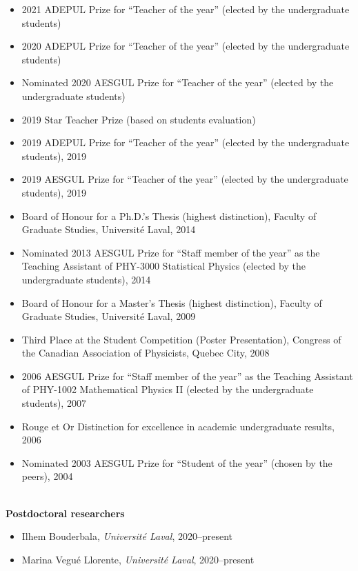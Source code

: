 \documentclass[11pt]{article}
\newlength{\BoxWidth}
\newcommand{\TitreA}[1]{\colorbox{background}{\makebox[\BoxWidth][c]{\Large\textrm{\textsc{#1}}}}\vspace{0.75\baselineskip}\\}
\newcommand{\SousTitreA}[2]{{\normalsize\textbf{#1} #2 \vspace{-0.5\baselineskip}}}
\newcommand{\SousTitreB}[2]{{\vspace{0.4\baselineskip}\SousTitreA{#1}{#2}}}
\newlength{\EspaceListe}
\begin{document}
%
%
%
\SousTitreB{Other Recognitions}{}
%
\begin{itemize}[itemsep=\EspaceListe]
  \item 2021 ADEPUL Prize for ``Teacher of the year'' (elected by the undergraduate students)
  \item 2020 ADEPUL Prize for ``Teacher of the year'' (elected by the undergraduate students)
  \item Nominated 2020 AESGUL Prize for ``Teacher of the year'' (elected by the undergraduate students)
  \item 2019 Star Teacher Prize (based on students evaluation)
  \item 2019 ADEPUL Prize for ``Teacher of the year'' (elected by the undergraduate students), 2019
  \item 2019 AESGUL Prize for ``Teacher of the year'' (elected by the undergraduate students), 2019
  \item Board of Honour for a Ph.D.'s Thesis (highest distinction), Faculty of Graduate Studies, Universit\'e Laval, 2014
  \item Nominated 2013 AESGUL Prize for ``Staff member of the year'' as the Teaching Assistant of PHY-3000 Statistical Physics (elected by the undergraduate students), 2014
  \item Board of Honour for a Master's Thesis (highest distinction), Faculty of Graduate Studies, Universit\'e Laval, 2009
  \item Third Place at the Student Competition (Poster Presentation), Congress of the Canadian Association of Physicists, Quebec City, 2008
  \item 2006 AESGUL Prize for ``Staff member of the year'' as the Teaching Assistant of PHY-1002 Mathematical Physics II (elected by the undergraduate students), 2007
  \item Rouge et Or Distinction for excellence in academic undergraduate results, 2006
  \item Nominated 2003 AESGUL Prize for ``Student of the year'' (chosen by the peers), 2004
\end{itemize}\vspace{0.75\baselineskip}
%
%
%
%
%
\TitreA{Mentoring}
%
\SousTitreA{Postdoctoral researchers}{}
%
\begin{itemize}[itemsep=\EspaceListe]
  \item Ilhem Bouderbala, \textit{Universit\'e Laval}, 2020--present
  \item Marina Vegué Llorente, \textit{Université Laval}, 2020--present
\end{itemize}
\end{document}
